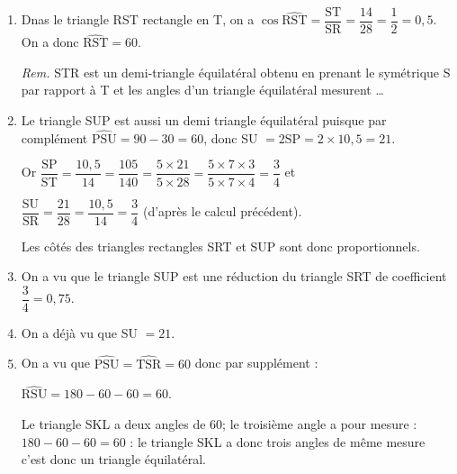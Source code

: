\documentclass[10pt]{article}
\begin{document}
\medskip

\begin{enumerate}
\item %
Dnas le triangle RST rectangle en T, on a $\cos \widehat{\text{RST}} = \dfrac{\text{ST}}{\text{SR}} = \dfrac{14}{28} = \dfrac{1}{2} = 0,5$. On a donc $\widehat{\text{RST}} = 60$\degres.

\smallskip

\emph{Rem.} STR est un demi-triangle équilatéral obtenu en prenant le symétrique S par rapport à T et les angles d'un triangle équilatéral mesurent \ldots 
\item %
Le triangle SUP est aussi un demi triangle équilatéral puisque par complément $\widehat{\text{PSU}} = 90 - 30 = 60$\degres, donc SU $ = 2 \text{SP} = 2 \times 10,5 = 21.$

Or $\dfrac{\text{SP}}{\text{ST}} = \dfrac{10,5}{14} = \dfrac{105}{140} = \dfrac{5 \times 21}{5 \times 28} = \dfrac{5 \times 7 \times 3}{5 \times 7 \times 4}
 = \dfrac{3}{4}$ et 
 
$\dfrac{\text{SU}}{\text{SR}} = \dfrac{21}{28} = \dfrac{10,5}{14} 
 = \dfrac{3}{4}$ (d'après le calcul précédent).
 
 Les côtés des triangles rectangles SRT et SUP sont donc proportionnels. 
 \item %
 On a vu que le triangle SUP est une réduction du triangle SRT de coefficient $\dfrac{3}{4} = 0,75$.
\item %
On a déjà vu que SU $ =  21$.
\item %
On a vu que  $\widehat{\text{PSU}} = \widehat{\text{TSR}} = 60$ donc par supplément :

$\widehat{\text{RSU}} = 180 - 60 - 60 = 60$\degres.

Le triangle SKL a deux angles de 60\degres ; le troisième angle a pour mesure : $180 - 60 - 60 = 60$ : le triangle SKL a donc trois angles de même mesure c'est donc un triangle équilatéral.
\end{enumerate}

\vspace{0.5cm}
\end{document}
